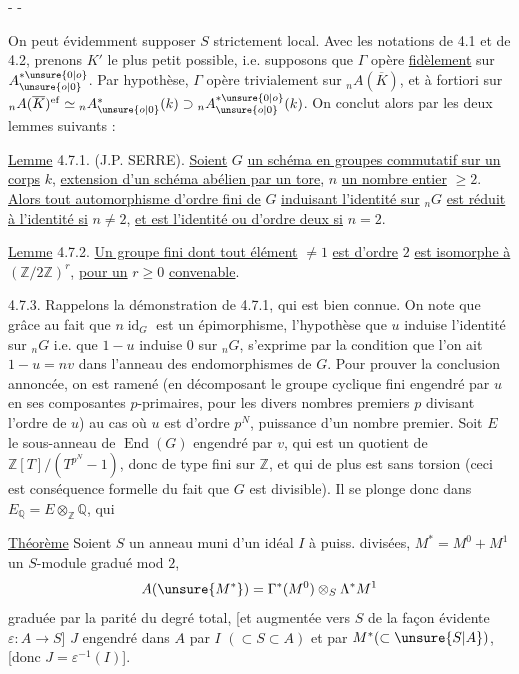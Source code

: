 \begin{center}-  -\end{center}

On peut évidemment supposer $S$ strictement local. Avec les notations de 4.1 et de 4.2, prenons $K'$ le plus petit possible, i.e. supposons que $\Gamma$ opère \uline{fidèlement} sur $A_{\unsure{o|0}}^{*\unsure{0|o}}$. Par hypothèse, $\Gamma$ opère trivialement sur ${}_nA(\overline K)$, et à fortiori sur ${}_nA(\overline K)^{\mathrm{ef}}\simeq{}_nA_{\unsure{o|0}}^*(k)\supset{}_nA_{\unsure{o|0}}^{*\unsure{0|o}}(k)$. On conclut alors par les deux lemmes suivants :

\uline{Lemme} 4.7.1. (J.P. SERRE). \uline{Soient} $G$ \uline{un schéma en groupes commutatif sur un corps} $k$, \uline{extension d'un schéma abélien par un tore}, $n$ \uline{un nombre entier} $\geq2$. \uline{Alors tout automorphisme d'ordre fini de} $G$ \uline{induisant l'identité sur} ${}_nG$ \uline{est réduit à l'identité si} $n\neq2$, \uline{et est l'identité ou d'ordre deux si} $n=2$.

\uline{Lemme} 4.7.2. \uline{Un groupe fini dont tout élément} $\neq1$ \uline{est d'ordre} $2$ \uline{est isomorphe à} $(\mathbb Z/2\mathbb Z)^r$, \uline{pour un} $r\geq0$ \uline{convenable}.

4.7.3. Rappelons la démonstration de 4.7.1, qui est bien connue. On note que grâce au fait que $n\operatorname{id}_G$ est un épimorphisme, l'hypothèse que $u$ induise l'identité sur ${}_nG$ i.e. que $1-u$ induise $0$ sur ${}_nG$, s'exprime par la condition que l'on ait $1-u=nv$ dans l'anneau des endomorphismes de $G$. Pour prouver la conclusion annoncée, on est ramené (en décomposant le groupe cyclique fini engendré par $u$ en ses composantes $p$-primaires, pour les divers nombres premiers $p$ divisant l'ordre de $u$) au cas où $u$ est d'ordre $p^N$, puissance d'un nombre premier. Soit $E$ le sous-anneau de $\operatorname{End}(G)$ engendré par $v$, qui est un quotient de $\mathbb Z[T]/(T^{p^N}-1)$, donc de type fini sur $\mathbb Z$, et qui de plus est sans torsion (ceci est conséquence formelle du fait que $G$ est divisible). Il se plonge donc dans $E_{\mathbb Q}=E\otimes_{\mathbb Z}\mathbb Q$, qui

\uline{Théorème} Soient $S$ un anneau muni d'un idéal $I$ à puiss. divisées, $M^*=M^0+M^1$ un $S$-module gradué mod $2$,
\[
A(\unsure{M^*})=\Gamma^*(M^0)\otimes_S\Lambda^*M^1
\]
 graduée par la parité du degré total, [et augmentée vers $S$ de la façon évidente $\varepsilon:A\longrightarrow S$] $J$  engendré dans $A$ par $I$ $(\subset S\subset A)$ et par $M^*(\subset\unsure{S|A})$, [donc $J=\varepsilon^{-1}(I)$].

